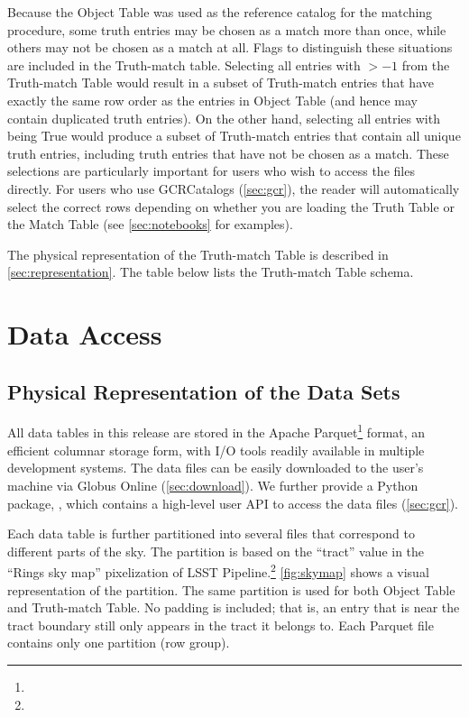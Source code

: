 \documentclass[11pt]{report}
\begin{document}
Because the Object Table was used as the reference catalog for the matching procedure, some truth entries may be chosen as a match more than once, while others may not be chosen as a match at all.
Flags to distinguish these situations are included in the Truth-match table. 
Selecting all entries with  $> -1$ from the Truth-match Table would result in a subset of Truth-match entries that have exactly the same row order as the entries in Object Table (and hence may contain duplicated truth entries). On the other hand, selecting all entries with  being True would produce a subset of Truth-match entries that contain all unique truth entries, including truth entries that have not be chosen as a match.
These selections are particularly important for users who wish to access the files directly. For users who use GCRCatalogs (\autoref{sec:gcr}), the reader will automatically select the correct rows depending on whether you are loading the Truth Table or the Match Table (see \autoref{sec:notebooks} for examples).


The physical representation of the Truth-match Table is described in \autoref{sec:representation}. The table below lists the Truth-match Table schema.





\section{Data Access}
\label{sec:access}


\subsection{Physical Representation of the Data Sets}
\label{sec:representation}

All data tables in this release are stored in the Apache Parquet\footnote{} format, an efficient columnar storage form, with I/O tools readily available in multiple development systems. 
The data files can be easily downloaded to the user's machine via Globus Online (\autoref{sec:download}). 
We further provide a Python package, , which contains a high-level user API to access the data files (\autoref{sec:gcr}). 

Each data table is further partitioned into several files that correspond to different parts of the sky. The partition is based on the ``tract'' value in the ``Rings sky map'' pixelization of LSST Pipeline.\footnote{} \autoref{fig:skymap} shows a visual representation of the partition. The same partition is used for both Object Table and Truth-match Table. No padding is included; that is, an entry that is near the tract boundary still only appears in the tract it belongs to. Each Parquet file contains only one partition (row group). 
\end{document}
